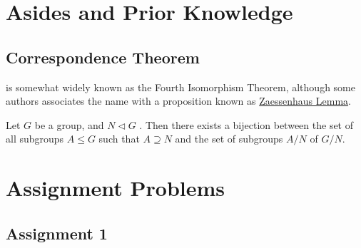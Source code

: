 \documentclass[notoc,notitlepage,nobib]{tufte-book}
\begin{document}
\appendix

\chapter{Asides and Prior Knowledge}%
\label{chp:asides_and_prior_knowledge}

\section{Correspondence Theorem}%
\label{sec:correspondence_theorem}

 is somewhat widely known 
as the Fourth Isomorphism Theorem, although some authors associates
the name with a proposition known as 
\href{https://en.wikipedia.org/wiki/Zassenhaus_lemma}{Zaessenhaus Lemma}.

\begin{thm}\label{thm:correspondence_theorem}
  Let $G$ be a group, and $N \triangleleft G$
  . Then there exists a bijection between
  the set of all subgroups $A \leq G$ such that $A \supseteq N$
  and the set of subgroups $A / N$ of $G / N$.
\end{thm}




\chapter{Assignment Problems}%
\label{chp:assignment_problems}

\section{Assignment 1}%
\label{sec:assignment_1}
\end{document}
